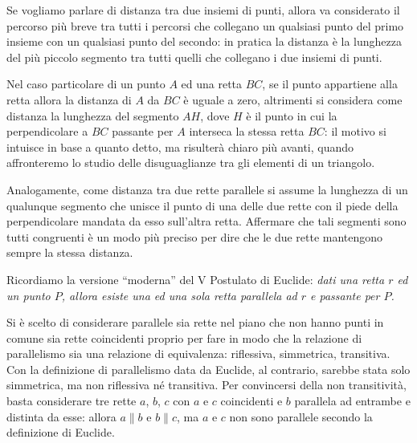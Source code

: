 Se vogliamo parlare di distanza tra due insiemi di punti, allora va 
considerato il percorso più breve tra tutti i percorsi che collegano 
un qualsiasi punto del primo insieme con un qualsiasi punto del 
secondo: in pratica la distanza è la lunghezza del più piccolo 
segmento tra tutti quelli che collegano i due insiemi di punti. 

Nel caso particolare di un punto $A$ ed una retta $BC$, se il punto 
appartiene alla retta allora la distanza di $A$ da $BC$ è uguale a 
zero, altrimenti si considera come distanza la lunghezza del segmento 
$AH$, dove $H$ è il punto in cui la perpendicolare a $BC$ passante 
per $A$ interseca la stessa retta $BC$: il motivo si intuisce in base 
a quanto detto, ma risulterà chiaro più avanti, quando affronteremo 
lo studio delle disuguaglianze tra gli elementi di un triangolo. 

Analogamente, come distanza tra due rette parallele si assume la 
lunghezza di un qualunque segmento che unisce il punto di una delle 
due rette con il piede della perpendicolare mandata da esso 
sull'altra retta. Affermare che tali segmenti sono tutti congruenti è 
un modo più preciso per dire che le due rette mantengono sempre la 
stessa distanza.

Ricordiamo la versione ``moderna'' del V Postulato di Euclide: 
\emph{dati una retta $r$ ed un punto $P$, allora esiste una ed una 
	sola retta parallela ad $r$ e passante per $P$.}

Si è scelto di considerare 
parallele sia rette nel piano che non hanno punti in comune sia rette 
coincidenti proprio per fare in modo che la relazione di parallelismo 
sia una relazione di equivalenza: riflessiva, simmetrica, transitiva. 
Con la definizione di parallelismo data da Euclide, al contrario, 
sarebbe stata solo simmetrica, ma non riflessiva né transitiva. Per 
convincersi della non transitività, basta considerare tre rette $a$, 
$b$, $c$ con $a$ e $c$ coincidenti e $b$ parallela ad entrambe e 
distinta da esse: allora $a\parallel b$ e $b \parallel c$, ma $a$ e 
$c$ non sono parallele secondo la definizione di Euclide.

